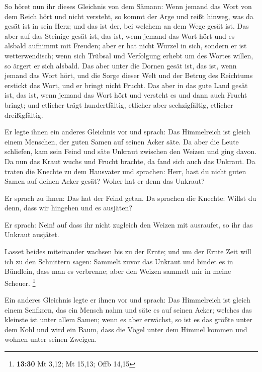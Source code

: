  So höret nun ihr dieses Gleichnis von dem Sämann:
 Wenn jemand das Wort von dem Reich hört und nicht
versteht, so kommt der Arge und reißt hinweg, was da gesät ist in sein
Herz; und das ist der, bei welchem an dem Wege gesät ist.
 Das aber auf das Steinige gesät ist, das ist, wenn
jemand das Wort hört und es alsbald aufnimmt mit Freuden;
 aber er hat nicht Wurzel in sich, sondern er ist
wetterwendisch; wenn sich Trübsal und Verfolgung erhebt um des Wortes
willen, so ärgert er sich alsbald.  Das aber unter die
Dornen gesät ist, das ist, wenn jemand das Wort hört, und die Sorge
dieser Welt und der Betrug des Reichtums erstickt das Wort, und er
bringt nicht Frucht.  Das aber in das gute Land gesät
ist, das ist, wenn jemand das Wort hört und versteht es und dann auch
Frucht bringt; und etlicher trägt hundertfältig, etlicher aber
sechzigfältig, etlicher dreißigfältig.

 Er legte ihnen ein anderes Gleichnis vor und sprach: Das
Himmelreich ist gleich einem Menschen, der guten Samen auf seinen Acker
säte.  Da aber die Leute schliefen, kam sein Feind und
säte Unkraut zwischen den Weizen und ging davon.  Da nun
das Kraut wuchs und Frucht brachte, da fand sich auch das Unkraut.
 Da traten die Knechte zu dem Hausvater und sprachen:
Herr, hast du nicht guten Samen auf deinen Acker gesät? Woher hat er
denn das Unkraut?

 Er sprach zu ihnen: Das hat der Feind getan. Da sprachen
die Knechte: Willst du denn, dass wir hingehen und es ausjäten?

 Er sprach: Nein! auf dass ihr nicht zugleich den Weizen
mit ausraufet, so ihr das Unkraut ausjätet.

 Lasset beides miteinander wachsen bis zu der Ernte; und
um der Ernte Zeit will ich zu den Schnittern sagen: Sammelt zuvor das
Unkraut und bindet es in Bündlein, dass man es verbrenne; aber den
Weizen sammelt mir in meine Scheuer. \footnote{\textbf{13:30} Mt 3,12;
  Mt 15,13; Offb 14,15}

 Ein anderes Gleichnis legte er ihnen vor und sprach: Das
Himmelreich ist gleich einem Senfkorn, das ein Mensch nahm und säte es
auf seinen Acker;  welches das kleinste ist unter allem
Samen; wenn es aber erwächst, so ist es das größte unter dem Kohl und
wird ein Baum, dass die Vögel unter dem Himmel kommen und wohnen unter
seinen Zweigen.

